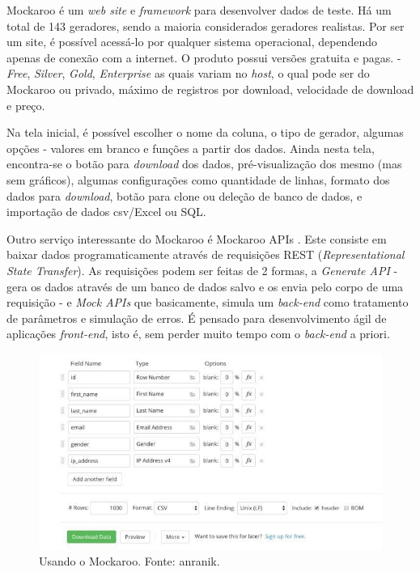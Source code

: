 \documentclass[
	12pt,				%
	openright,			%
	twoside,			%
	a4paper,			%
	english,			%
	brazil				%
	]{abntex2}
\begin{document}
		Mockaroo \cite{mockaroo} é um \emph{web site} e \emph{framework} para desenvolver dados de teste.
		Há um total de 143 geradores, sendo a maioria considerados geradores realistas.
		Por ser um site, é possível acessá-lo por qualquer sistema operacional, dependendo apenas de conexão com a internet.
		O produto possui versões gratuita e pagas. - \emph{Free}, \emph{Silver}, \emph{Gold}, \emph{Enterprise} as quais variam no \emph{host}, o qual pode ser do Mockaroo ou privado, máximo de registros por download, velocidade de download e preço.
		\par
		Na tela inicial, é possível escolher o nome da coluna, o tipo de gerador, algumas opções - valores em branco e funções a partir dos dados.
		Ainda nesta tela, encontra-se o botão para \emph{download} dos dados, pré-visualização dos mesmo (mas sem gráficos), algumas configurações como quantidade de linhas, formato dos dados para \emph{download}, botão para clone ou deleção de banco de dados, e importação de dados csv/Excel ou SQL.
		\par
		Outro serviço interessante do Mockaroo é Mockaroo APIs \cite{mockarooAPI}.
		Este consiste em baixar dados programaticamente através de requisições REST (\emph{Representational State Transfer}).
		As requisições podem ser feitas de 2 formas, a \emph{Generate API} - gera os dados através de um banco de dados salvo e os envia pelo corpo de uma requisição - 
		e \emph{Mock APIs} que basicamente, simula um \emph{back-end} como tratamento de parâmetros e simulação de erros. 
		É pensado para desenvolvimento ágil de aplicações \emph{front-end}, isto é, sem perder muito tempo com o \emph{back-end} a priori.
		\begin{figure}[h]
			\centering
			\includegraphics[width=\linewidth]{./figures/TrabalhosRelacionados/mockaroo.jpg}
			\caption{Usando o Mockaroo. Fonte: anranik.}
			\label{fig:mockaroo}
		\end{figure}
\end{document}

